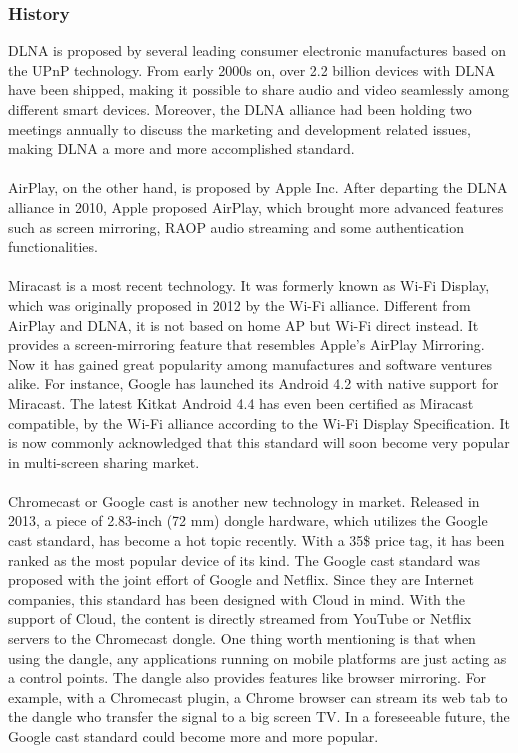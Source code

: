 \subsubsection{History} 
DLNA is proposed by several leading consumer electronic manufactures based on the UPnP 
technology. From early 2000s on, over 2.2 billion devices with DLNA have been shipped, 
making it possible to share audio and video seamlessly among different smart devices. Moreover, the DLNA alliance had been holding two meetings annually to discuss the marketing and development related issues, making DLNA a more and more accomplished standard. \\
\\
AirPlay, on the other hand, is proposed by Apple Inc. After departing the DLNA alliance in 2010, Apple proposed AirPlay, which brought more advanced features such as screen mirroring, RAOP audio streaming and some authentication functionalities. \\
\\
Miracast is a most recent technology. It was formerly known as Wi-Fi Display, which was originally proposed in 2012 by the Wi-Fi alliance. Different from AirPlay and DLNA, it is not based on home AP but Wi-Fi direct instead. It provides a screen-mirroring feature that resembles Apple's AirPlay Mirroring. Now it has gained great popularity among manufactures and software ventures alike. For instance, Google has launched its Android 4.2 with native support for Miracast. The latest Kitkat Android 4.4 has even been certified as Miracast compatible, by the Wi-Fi alliance according to the Wi-Fi Display Specification. It is now commonly acknowledged that this standard will soon become very popular in multi-screen sharing market. \\
\\
Chromecast or Google cast is another new technology in 
market. Released in 2013, a piece of 2.83-inch (72 mm) dongle hardware, which utilizes the Google cast standard, has become a hot topic recently. With a 35\$ price tag, it has been ranked as the most 
popular device of its kind. The Google cast standard was proposed with the joint effort of 
Google and Netflix. Since they are Internet companies, this standard has been 
designed with Cloud in mind. With the support of Cloud, the content is directly streamed from YouTube or Netflix servers to the Chromecast dongle. One thing worth mentioning is that when using the dangle, any applications running on mobile platforms are just acting as a control points. The dangle also provides features like browser mirroring. For example, with a Chromecast plugin, a Chrome browser can stream its web tab to the dangle who transfer the signal to a big screen TV. In a foreseeable future, the Google cast standard could become more and more popular. 

